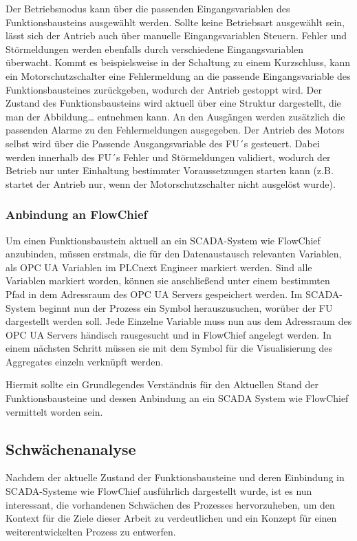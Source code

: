 Der Betriebsmodus kann über die passenden Eingangsvariablen des Funktionsbausteins ausgewählt werden. Sollte keine Betriebsart ausgewählt sein, lässt sich der Antrieb auch über manuelle Eingangsvariablen Steuern. Fehler und Störmeldungen werden ebenfalls durch verschiedene Eingangsvariablen überwacht. Kommt es beispielsweise in der Schaltung zu einem Kurzschluss, kann ein Motorschutzschalter eine Fehlermeldung an die passende Eingangsvariable des Funktionsbausteines zurückgeben, wodurch der Antrieb gestoppt wird. Der Zustand des Funktionsbausteins wird aktuell über eine Struktur dargestellt, die man der Abbildung… entnehmen kann. An den Ausgängen werden zusätzlich die passenden Alarme zu den Fehlermeldungen ausgegeben.
Der Antrieb des Motors selbst wird über die Passende Ausgangsvariable des FU´s gesteuert. Dabei werden innerhalb des FU´s Fehler und Störmeldungen validiert, wodurch der Betrieb nur unter Einhaltung bestimmter Voraussetzungen starten kann (z.B. startet der Antrieb nur, wenn der Motorschutzschalter nicht ausgelöst wurde). 

\subsubsection{Anbindung an FlowChief}
Um einen Funktionsbaustein aktuell an ein SCADA-System wie FlowChief anzubinden, müssen erstmals, die für den Datenaustausch relevanten Variablen, als OPC UA Variablen im PLCnext Engineer markiert werden. Sind alle Variablen markiert worden, können sie anschließend unter einem bestimmten Pfad in dem Adressraum des OPC UA Servers gespeichert werden. Im SCADA-System beginnt nun der Prozess ein Symbol herauszusuchen, worüber der FU dargestellt werden soll. Jede Einzelne Variable muss nun aus dem Adressraum des OPC UA Servers händisch rausgesucht und in FlowChief angelegt werden. In einem nächsten Schritt müssen sie mit dem Symbol für die Visualisierung des Aggregates einzeln verknüpft werden.

Hiermit sollte ein Grundlegendes Verständnis für den Aktuellen Stand der Funktionsbausteine und dessen Anbindung an ein SCADA System wie FlowChief vermittelt worden sein.

\subsection{Schwächenanalyse}
Nachdem der aktuelle Zustand der Funktionsbausteine und deren Einbindung in SCADA-Systeme wie FlowChief ausführlich dargestellt wurde, ist es nun interessant, die vorhandenen Schwächen des Prozesses hervorzuheben, um den Kontext für die Ziele dieser Arbeit zu verdeutlichen und ein Konzept für einen weiterentwickelten Prozess zu entwerfen.

